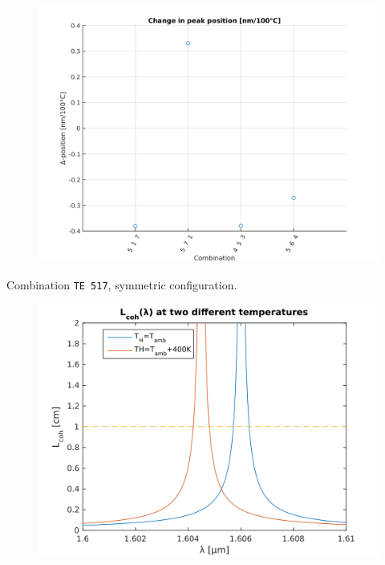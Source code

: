 \documentclass[11pt, leqno]{beamer}
\begin{document}
\begin{frame}
	\begin{figure}
		\centering
		\includegraphics[height=.9\textheight]{ppc2.png}
	\end{figure}
\end{frame}
\begin{frame}
	Combination \texttt{TE 517}, symmetric configuration.
	\begin{figure}
		\centering
		\includegraphics[width=.8\textwidth]{bandwidth_movement_TE517_sym.png}
	\end{figure}
\end{frame}
\end{document}
